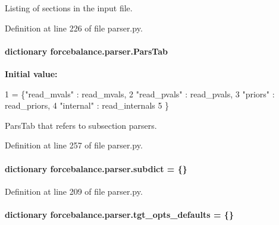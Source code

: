 Listing of sections in the input file. 



Definition at line 226 of file parser.\-py.

\hypertarget{namespaceforcebalance_1_1parser_a492c80e361e80dc74aebc13e7a072dfb}{
\paragraph[{Pars\-Tab}]{\setlength{\rightskip}{0pt plus 5cm}dictionary forcebalance.\-parser.\-Pars\-Tab}}\label{namespaceforcebalance_1_1parser_a492c80e361e80dc74aebc13e7a072dfb}
{\bfseries Initial value\-:}
\begin{DoxyCode}
1 = \{\textcolor{stringliteral}{"read\_mvals"} : read\_mvals,
2             \textcolor{stringliteral}{"read\_pvals"} : read\_pvals,
3             \textcolor{stringliteral}{"priors"}     : read\_priors,
4             \textcolor{stringliteral}{"internal"}   : read\_internals
5             \}
\end{DoxyCode}


Pars\-Tab that refers to subsection parsers. 



Definition at line 257 of file parser.\-py.

\hypertarget{namespaceforcebalance_1_1parser_abb7a7e9723de629aa97727a85bcdbad1}{
\paragraph[{subdict}]{\setlength{\rightskip}{0pt plus 5cm}dictionary forcebalance.\-parser.\-subdict = \{\}}}\label{namespaceforcebalance_1_1parser_abb7a7e9723de629aa97727a85bcdbad1}


Definition at line 209 of file parser.\-py.

\hypertarget{namespaceforcebalance_1_1parser_aff4922444f06b7334a0994a835607393}{
\paragraph[{tgt\-\_\-opts\-\_\-defaults}]{\setlength{\rightskip}{0pt plus 5cm}dictionary forcebalance.\-parser.\-tgt\-\_\-opts\-\_\-defaults = \{\}}}\label{namespaceforcebalance_1_1parser_aff4922444f06b7334a0994a835607393}


